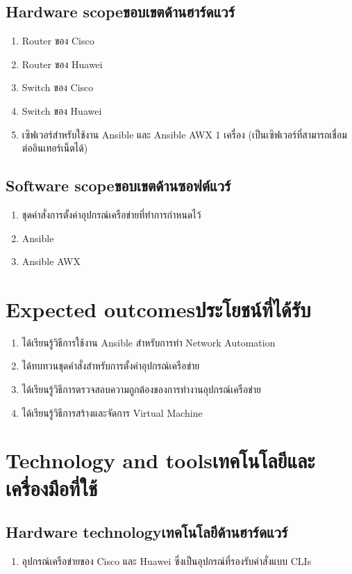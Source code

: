 \subsection{\ifenglish Hardware scope\else ขอบเขตด้านฮาร์ดแวร์\fi}
\begin{enumerate}
    \item {Router ของ Cisco}
    \item {Router ของ Huawei}
    \item {Switch ของ Cisco}
    \item {Switch ของ Huawei}
    \item {เซิฟเวอร์สำหรับใช้งาน Ansible และ Ansible AWX 1 เครื่อง (เป็นเซิฟเวอร์ที่สามารถเชื่อมต่ออินเทอร์เน็ตได้)}
\end{enumerate}
\subsection{\ifenglish Software scope\else ขอบเขตด้านซอฟต์แวร์\fi}
\begin{enumerate}
    \item {ชุดคำสั่งการตั้งค่าอุปกรณ์เครือข่ายที่ทำการกำหนดไว้}
    \item {Ansible}
    \item {Ansible AWX}
\end{enumerate}
\section{\ifenglish Expected outcomes\else ประโยชน์ที่ได้รับ\fi}
\begin{enumerate}
    \item {ได้เรียนรู้วิธีการใช้งาน Ansible สำหรับการทำ Network Automation}
    \item {ได้ทบทวนชุดคำสั่งสำหรับการตั้งค่าอุปกรณ์เครือข่าย}
    \item {ได้เรียนรู้วิธีการตรวจสอบความถูกต้องของการทำงานอุปกรณ์เครือข่าย}
    \item {ได้เรียนรู้วิธีการสร้างและจัดการ Virtual Machine }
\end{enumerate}
\section{\ifenglish Technology and tools\else เทคโนโลยีและเครื่องมือที่ใช้\fi}
    
\subsection{\ifenglish Hardware technology\else เทคโนโลยีด้านฮาร์ดแวร์\fi}
\begin{enumerate}
    \item {อุปกรณ์เครือข่ายของ Cisco และ Huawei ซึ่งเป็นอุปกรณ์ที่รองรับคำสั่งแบบ CLIs}
\end{enumerate}
